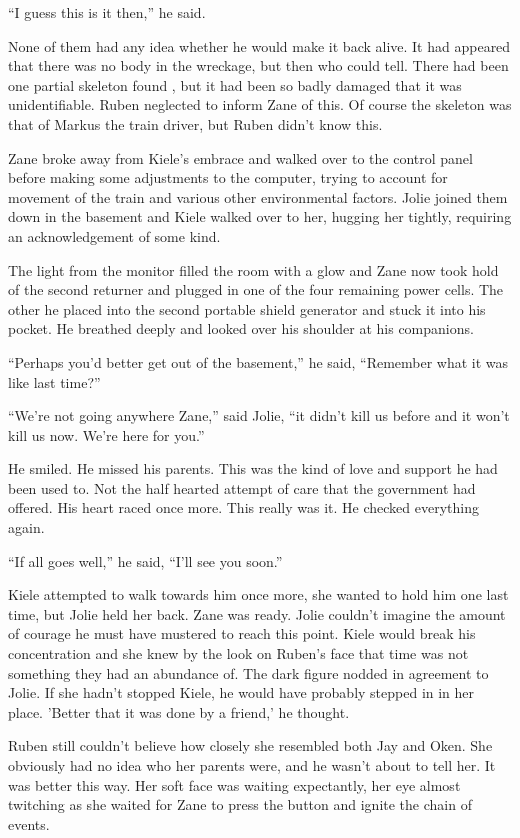 ``I guess this is it then,'' he said.  

None of them had any idea whether he would make it back alive.  It had appeared that there was no body in the wreckage, but then who could tell.  There had been one partial skeleton found , but it had been so badly damaged that it was unidentifiable.  Ruben neglected to inform Zane of this.  Of course the skeleton was that of Markus the train driver, but Ruben didn't know this.

Zane broke away from Kiele's embrace and walked over to the control panel before making some adjustments to the computer, trying to account for movement of the train and various other environmental factors.  Jolie joined them down in the basement and Kiele walked over to her, hugging her tightly, requiring an acknowledgement of some kind.

The light from the monitor filled the room with a glow and Zane now took hold of the second returner and plugged in one of the four remaining power cells.  The other he placed into the second portable shield generator and stuck it into his pocket.  He breathed deeply and looked over his shoulder at his companions.

``Perhaps you'd better get out of the basement,'' he said, ``Remember what it was like last time?''

``We're not going anywhere Zane,'' said Jolie, ``it didn't kill us before and it won't kill us now.  We're here for you.''

He smiled.  He missed his parents.  This was the kind of love and support he had been used to.  Not the half hearted attempt of care that the government had offered.  His heart raced once more.  This really was it.  He checked everything again.  

``If all goes well,'' he said, ``I'll see you soon.''  

Kiele attempted to walk towards him once more, she wanted to hold him one last time, but Jolie held her back.  Zane was ready.  Jolie couldn't imagine the amount of courage he must have mustered to reach this point.  Kiele would break his concentration and she knew by the look on Ruben's face that time was not something they had an abundance of.  The dark figure nodded in agreement to Jolie.  If she hadn't stopped Kiele, he would have probably stepped in in her place.  'Better that it was done by a friend,' he thought.  

Ruben still couldn't believe how closely she resembled both Jay and Oken.  She obviously had no idea who her parents were, and he wasn't about to tell her.  It was better this way.  Her soft face was waiting expectantly, her eye almost twitching as she waited for Zane to press the button and ignite the chain of events.

